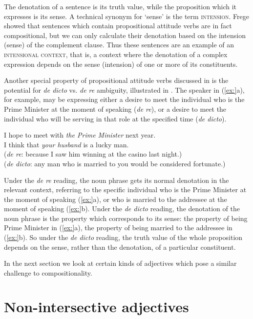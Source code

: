 The denotation of a sentence is its truth value, while the proposition which it expresses is its sense. A technical synonym for ‘sense’ is the term \textsc{intension}. Frege showed that sentences which contain propositional attitude verbs are in fact compositional, but we can only calculate their denotation based on the intension (sense) of the complement clause. Thus these sentences are an example of an \textsc{intensional context}, that is, a context where the denotation of a complex expression depends on the sense (intension) of one or more of its constituents.



Another special property of propositional attitude verbs discussed in  is the potential for \textit{de dicto} vs. \textit{de re} ambiguity, illustrated in . The speaker in (\ref{ex:}a), for example, may be expressing either a desire to meet the individual who is the Prime Minister at the moment of speaking (\textit{de re}), or a desire to meet the individual who will be serving in that role at the specified time (\textit{de dicto}).


\ea
\ea I hope to meet with \textit{the Prime Minister} next year.\\
\ex I think that \textit{your husband} is a lucky man.\\
  (\textit{de re}: because I saw him winning at the casino last night.)\\
  (\textit{de dicto}: any man who is married to you would be considered fortunate.)
                       \z
\z


Under the \textit{de re} reading, the noun phrase gets its normal denotation in the relevant context, referring to the specific individual who is the Prime Minister at the moment of speaking (\ref{ex:}a), or who is married to the addressee at the moment of speaking (\ref{ex:}b). Under the \textit{de dicto} reading, the denotation of the noun phrase is the property which corresponds to its sense: the property of being Prime Minister in (\ref{ex:}a), the property of being married to the addressee in (\ref{ex:}b). So under the \textit{de dicto} reading, the truth value of the whole proposition depends on the sense, rather than the denotation, of a particular constituent.



In the next section we look at certain kinds of adjectives which pose a similar challenge to compositionality.


\section{Non-intersective adjectives}\label{sec:15.3}

